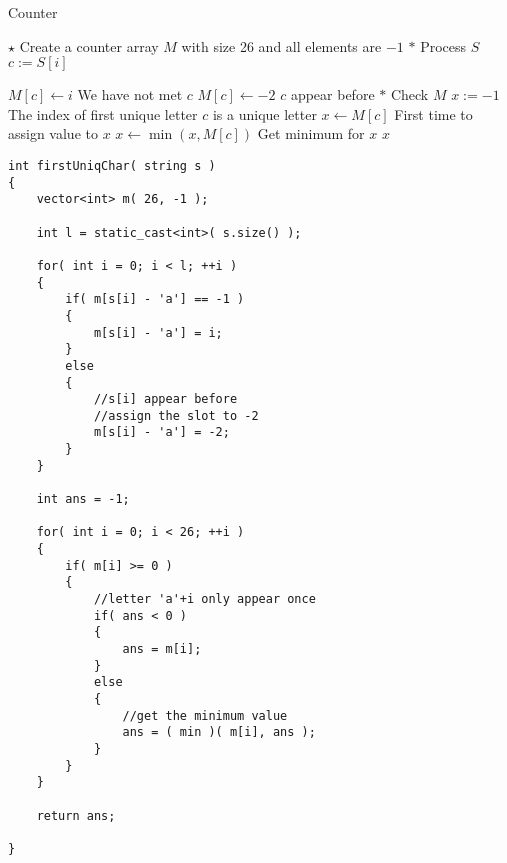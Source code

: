 \begin{algorithm}[H]
\caption{Counter}
\begin{algorithmic}[1]
\State $\star$ Create a counter array $M$ with size 26 and all elements are $-1$
\State $\ast$ Process $S$
\State $c:=S[i]$
\end{algorithmic}
\end{algorithm}
\begin{algorithm}[H]
\begin{algorithmic}[1]
\State $M[c]\gets i$ \Comment We have not met $c$
\Else
\State $M[c]\gets -2$ \Comment $c$ appear before
\EndIf
\EndFor
\State $\ast$ Check $M$
\State $x:=-1$ \Comment The index of first unique letter
 \Comment $c$ is a unique letter
\State $x\gets M[c]$ \Comment First time to assign value to $x$
\Else
\State $x\gets\min(x, M[c])$ \Comment Get minimum for $x$
\EndIf
\EndIf
\EndFor
\State \Return $x$
\EndProcedure
\end{algorithmic}
\end{algorithm}

\setcounter{lstlisting}{0}
\begin{lstlisting}[style=customc, caption={Counter}]
int firstUniqChar( string s )
{
    vector<int> m( 26, -1 );

    int l = static_cast<int>( s.size() );

    for( int i = 0; i < l; ++i )
    {
        if( m[s[i] - 'a'] == -1 )
        {
            m[s[i] - 'a'] = i;
        }
        else
        {
            //s[i] appear before
            //assign the slot to -2
            m[s[i] - 'a'] = -2;
        }
    }

    int ans = -1;

    for( int i = 0; i < 26; ++i )
    {
        if( m[i] >= 0 )
        {
            //letter 'a'+i only appear once
            if( ans < 0 )
            {
                ans = m[i];
            }
            else
            {
                //get the minimum value
                ans = ( min )( m[i], ans );
            }
        }
    }

    return ans;

}
\end{lstlisting}